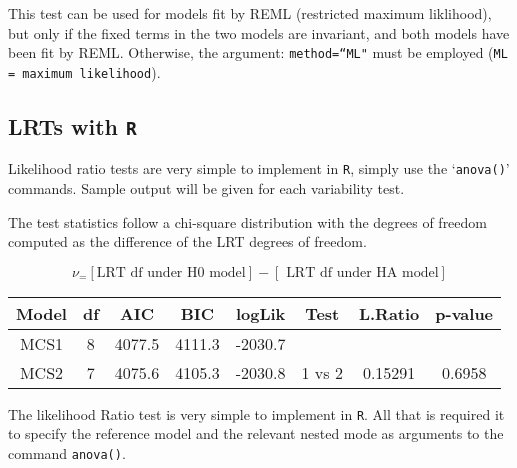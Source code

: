 \documentclass[12pt, a4paper]{article}
\theoremstyle{plain}
\theoremstyle{definition}
\theoremstyle{remark}
\begin{document}
This test can be used for models fit by REML (restricted maximum liklihood), but only if the fixed terms in the two models are invariant, and both models have been fit by REML. Otherwise, 
the argument: \texttt{method=``ML"} must be employed (\texttt{ML = maximum likelihood}). 



\subsection{LRTs with \texttt{R}}
Likelihood ratio tests are very simple to implement in \texttt{R}, simply use the `\texttt{anova()}'
commands. Sample output will be given for each variability test. 


%



The test statistics follow a 
chi-square distribution with the degrees of freedom
computed as the difference of the LRT degrees of freedom.

\begin{equation}
\nu_ = [ \mbox{LRT df under H0 model}] - [\mbox{ LRT df under HA model}]
\end{equation}

%
%
%
\begin{center}
	\begin{tabular}{|c|c|c|c|c|c|c|c|}
		\hline
		Model   &      df &   AIC  & BIC      & logLik & Test & L.Ratio & p-value \\ \hline
		MCS1    &       8 & 4077.5 & 4111.3 & -2030.7  &       &         &        \\ \hline
		MCS2    &       7 & 4075.6 & 4105.3 & -2030.8  & 1 vs 2 & 0.15291 & 0.6958 \\
		\hline 
	\end{tabular} 
\end{center}

The likelihood Ratio test is very simple to implement in \texttt{R}. All that is required it to specify the reference model and the relevant nested mode as arguments to the command \texttt{anova()}.
\end{document}
